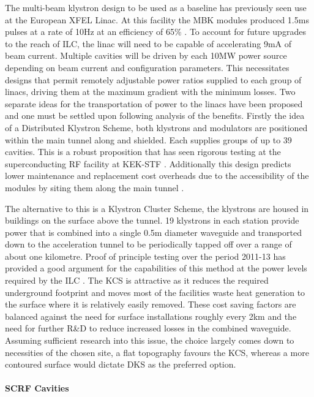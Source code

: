 The multi-beam klystron design to be used as a baseline has previously seen use at the European XFEL Linac. At this facility the MBK modules produced 1.5ms pulses at a rate of 10Hz at an efficiency of 65\% \cite{LINAC:KlystronsXFEL}. To account for future upgrades to the reach of ILC, the linac will need to be capable of accelerating 9mA of beam current. Multiple cavities will be driven by each 10MW power source depending on beam current and configuration parameters. This necessitates designs that permit remotely adjustable power ratios supplied to each group of linacs, driving them at the maximum gradient with the minimum losses.
Two separate ideas for the transportation of power to the linacs have been proposed and one must be settled upon following analysis of the benefits. Firstly the idea of a Distributed Klystron Scheme, both klystrons and modulators are positioned within the main tunnel along and shielded. Each supplies groups of up to 39 cavities. This is a robust proposition that has seen rigorous testing at the superconducting RF facility at KEK-STF \cite{IPAC:DRFSTest}. Additionally this design predicts lower maintenance and replacement cost overheads due to the accessibility of the modules by siting them along the main tunnel \cite{LINAC:DRFS}.

The alternative to this is a Klystron Cluster Scheme, the klystrons are housed in buildings on the surface above the tunnel. 19 klystrons in each station provide power that is combined into a single 0.5m diameter waveguide and transported down to the acceleration tunnel to be periodically tapped off over a range of about one kilometre. Proof of principle testing over the period 2011-13 has provided a good argument for the capabilities of this method at the power levels required by the ILC \cite{IPAC:Klystron}. The KCS is attractive as it reduces the required underground footprint and moves most of the facilities waste heat generation to the surface where it is relatively easily removed. These cost saving factors are balanced against the need for surface installations roughly every 2km and the need for further R\&D to reduce increased losses in the combined waveguide. Assuming sufficient research into this issue, the choice largely comes down to necessities of the chosen site, a flat topography favours the KCS, whereas a more contoured surface would dictate DKS as the preferred option.

\paragraph{SCRF Cavities}

